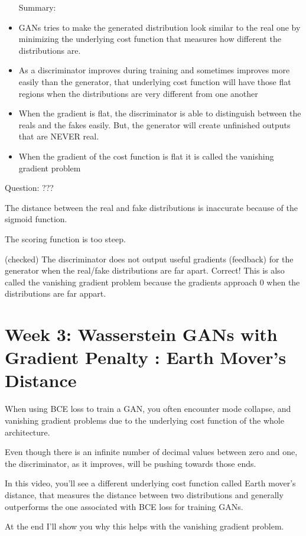 \documentclass[11pt, onecolumn]{article}
\begin{document}
\begin{itemize}
Summary:
\item GANs tries to make the generated distribution look similar to the real one by minimizing the underlying cost function that measures how different the distributions are.
\item As a discriminator improves during training and sometimes improves more easily than the generator, that underlying cost function will have those flat regions when the distributions are very different from one another
\item When the gradient is flat, the discriminator is able to distinguish between the reals and the fakes easily.  But, the generator will create unfinished outputs that are NEVER real. 
\item When the gradient of the cost function is flat it is called the vanishing gradient problem
\end{itemize}

Question:
???


The distance between the real and fake distributions is inaccurate because of the sigmoid function.

The scoring function is too steep.

(checked) The discriminator does not output useful gradients (feedback) for the generator when the real/fake distributions are far apart.
Correct! This is also called the vanishing gradient problem because the gradients approach 0 when the distributions are far appart. 


\section{Week 3: Wasserstein GANs with Gradient Penalty : Earth Mover's Distance}

When using BCE loss to train a GAN, you often encounter mode collapse, and vanishing gradient problems due to the underlying cost function of the whole architecture.

Even though there is an infinite number of decimal values between zero and one, the discriminator, as it improves, will be pushing towards those ends.


In this video, you'll see a different underlying cost function called Earth mover's distance, that measures the distance between two distributions and generally outperforms the one associated with BCE loss for training GANs.

At the end I'll show you why this helps with the vanishing gradient problem.
\end{document}

